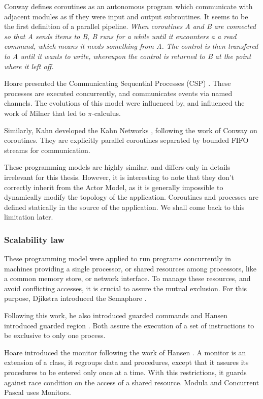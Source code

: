 Conway defines coroutines as an autonomous program which communicate with adjacent modules as if they were input and output subroutines.\cite{Conway1963}
It seems to be the first definition of a parallel pipeline.
\textit{When coroutines A and B are connected so that A sends items to B, B runs for a while until it encounters a a read command, which means it needs something from A. The control is then transfered to A until it wants to write, whereupon the control is returned to B at the point where it left off.}

Hoare presented the Communicating Sequential Processes (CSP) \cite{Hoare1978, Brookes1984}.
These processes are executed concurrently, and communicates events via named channels.
The evolutions of this model were influenced by, and influenced the work of Milner that led to $\pi$-calculus.

Similarly, Kahn developed the Kahn Networks \cite{Kahn1974, Kahn1976}, following the work of Conway on coroutines.
They are explicitly parallel coroutines separated by bounded FIFO streams for communication.

These programming models are highly similar, and differs only in details irrelevant for this thesis.
However, it is interesting to note that they don't correctly inherit from the Actor Model, as it is generally impossible to dynamically modify the topology of the application.
Coroutines and processes are defined statically in the source of the application.
We shall come back to this limitation later.

\subsubsection{Scalability law}

These programming model were applied to run programs concurrently in machines providing a single processor, or shared resources among processors, like a common memory store, or network interface.
To manage these resources, and avoid conflicting accesses, it is crucial to assure the mutual exclusion.
For this purpose, Djikstra introduced the Semaphore \cite{Dijkstra}.

Following this work, he also introduced guarded commands \cite{Dijkstra1975} and Hansen introduced guarded region \cite{Hansen1978a}.
Both assure the execution of a set of instructions to be exclusive to only one process.

Hoare introduced the monitor following the work of Hansen \cite{Hoare1974}.
A monitor is an extension of a class, it regroups data and procedures, except that it assures its procedures to be entered only once at a time.
With this restrictions, it guards against race condition on the access of a shared resource.
Modula \cite{Wirth1977} and Concurrent Pascal \cite{Hansen1975} uses Monitors.

